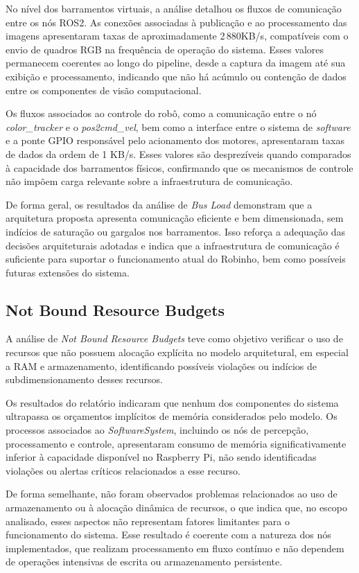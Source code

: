 No nível dos barramentos virtuais, a análise detalhou os fluxos de comunicação entre os nós ROS2. As conexões associadas à publicação e ao processamento das imagens apresentaram taxas de aproximadamente 2\,880KB/s, compatíveis com o envio de quadros RGB na frequência de operação do sistema. Esses valores permanecem coerentes ao longo do pipeline, desde a captura da imagem até sua exibição e processamento, indicando que não há acúmulo ou contenção de dados entre os componentes de visão computacional.

Os fluxos associados ao controle do robô, como a comunicação entre o nó \textit{color\_tracker} e o \textit{pos2cmd\_vel}, bem como a interface entre o sistema de \textit{software} e a ponte GPIO responsável pelo acionamento dos motores, apresentaram taxas de dados da ordem de 1 KB/s. Esses valores são desprezíveis quando comparados à capacidade dos barramentos físicos, confirmando que os mecanismos de controle não impõem carga relevante sobre a infraestrutura de comunicação.

De forma geral, os resultados da análise de \textit{Bus Load} demonstram que a arquitetura proposta apresenta comunicação eficiente e bem dimensionada, sem indícios de saturação ou gargalos nos barramentos. Isso reforça a adequação das decisões arquiteturais adotadas e indica que a infraestrutura de comunicação é suficiente para suportar o funcionamento atual do Robinho, bem como possíveis futuras extensões do sistema.

\subsection{Not Bound Resource Budgets}

A análise de \textit{Not Bound Resource Budgets} teve como objetivo verificar o uso de recursos que não possuem alocação explícita no modelo arquitetural, em especial a RAM e armazenamento, identificando possíveis violações ou indícios de subdimensionamento desses recursos.

Os resultados do relatório indicaram que nenhum dos componentes do sistema ultrapassa os orçamentos implícitos de memória considerados pelo modelo. Os processos associados ao \textit{SoftwareSystem}, incluindo os nós de percepção, processamento e controle, apresentaram consumo de memória significativamente inferior à capacidade disponível no Raspberry Pi, não sendo identificadas violações ou alertas críticos relacionados a esse recurso.

De forma semelhante, não foram observados problemas relacionados ao uso de armazenamento ou à alocação dinâmica de recursos, o que indica que, no escopo analisado, esses aspectos não representam fatores limitantes para o funcionamento do sistema. Esse resultado é coerente com a natureza dos nós implementados, que realizam processamento em fluxo contínuo e não dependem de operações intensivas de escrita ou armazenamento persistente.

